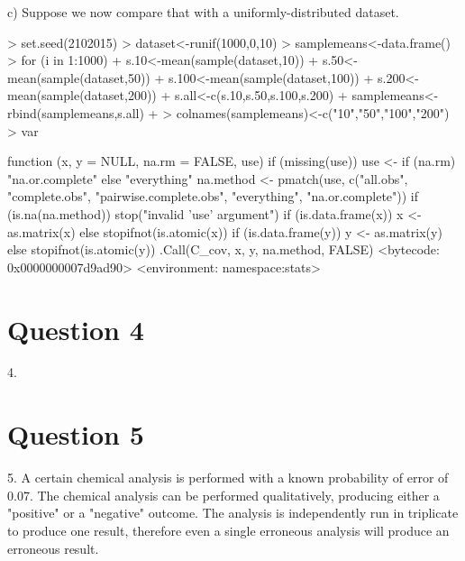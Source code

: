 \documentclass[12pt,letterpaper]{article}
\begin{document}
{c)  Suppose we now compare that with a uniformly-distributed dataset.
\begin{Schunk}
\begin{Sinput}
> set.seed(2102015)
> dataset<-runif(1000,0,10)
> samplemeans<-data.frame()
> for (i in 1:1000){
+     s.10<-mean(sample(dataset,10)) 
+     s.50<-mean(sample(dataset,50))
+     s.100<-mean(sample(dataset,100))
+     s.200<-mean(sample(dataset,200))
+     s.all<-c(s.10,s.50,s.100,s.200)
+     samplemeans<-rbind(samplemeans,s.all)
+ }
> colnames(samplemeans)<-c("10","50","100","200")
> var
\end{Sinput}
\begin{Soutput}
function (x, y = NULL, na.rm = FALSE, use) 
{
    if (missing(use)) 
        use <- if (na.rm) 
            "na.or.complete"
        else "everything"
    na.method <- pmatch(use, c("all.obs", "complete.obs", "pairwise.complete.obs", 
        "everything", "na.or.complete"))
    if (is.na(na.method)) 
        stop("invalid 'use' argument")
    if (is.data.frame(x)) 
        x <- as.matrix(x)
    else stopifnot(is.atomic(x))
    if (is.data.frame(y)) 
        y <- as.matrix(y)
    else stopifnot(is.atomic(y))
    .Call(C_cov, x, y, na.method, FALSE)
}
<bytecode: 0x0000000007d9ad90>
<environment: namespace:stats>
\end{Soutput}
\end{Schunk}



\section*{Question 4}
4.


\section*{Question 5}
5.
A certain chemical analysis is performed with a known probability of error of 0.07.  The chemical analysis can be performed qualitatively, producing either a "positive" or a "negative" outcome.  The analysis is independently run in triplicate to produce one result, therefore even a single erroneous analysis will produce an erroneous result.

}
\end{document}
